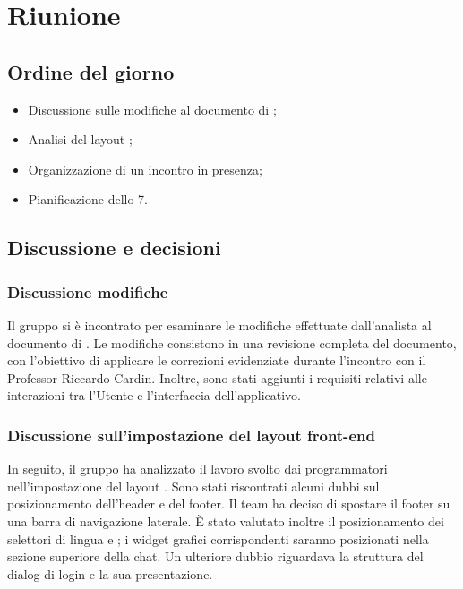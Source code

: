 \section{Riunione}
\subsection{Ordine del giorno}
\begin{itemize}
	\item Discussione sulle modifiche al documento di \AdR;
	\item Analisi del layout ;
	\item Organizzazione di un incontro in presenza;
	\item Pianificazione dello  7.
\end{itemize}

\subsection{Discussione e decisioni}
\subsubsection{Discussione modifiche \AdR}
\par Il gruppo si è incontrato per esaminare le modifiche effettuate dall'analista al documento di \AdR. Le modifiche consistono in una revisione completa del documento, con l'obiettivo di applicare le correzioni evidenziate durante l'incontro con il Professor Riccardo Cardin. Inoltre, sono stati aggiunti i requisiti relativi alle interazioni tra l'Utente e l'interfaccia dell'applicativo.

\subsubsection{Discussione sull'impostazione del layout front-end}
\par In seguito, il gruppo ha analizzato il lavoro svolto dai programmatori nell'impostazione del layout . Sono stati riscontrati alcuni dubbi sul posizionamento dell'header e del footer. Il team ha deciso di spostare il footer su una barra di navigazione laterale. È stato valutato inoltre il posizionamento dei selettori di lingua e ; i widget grafici corrispondenti saranno posizionati nella sezione superiore della chat. Un ulteriore dubbio riguardava la struttura del dialog di login e la sua presentazione.

